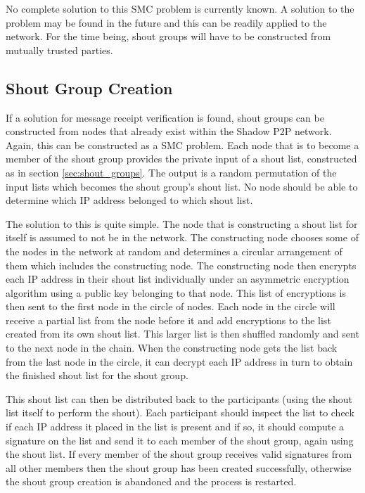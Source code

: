 \documentclass[ %
                    author={Luke Murray},
                supervisor={Dr. Simon Hollis},
                     title={Shadow Peer-to-Peer Networks},
                  subtitle={},
                    degree={MEng},
                      year={2013} ]{thesis}
\begin{document}

No complete solution to this SMC problem is currently known. A solution to the problem may be found in the future and this can be readily applied to the network. For the time being, shout groups will have to be constructed from mutually trusted parties.

\subsection{Shout Group Creation}

If a solution for message receipt verification is found, shout groups can be constructed from nodes that already exist within the Shadow P2P network. Again, this can be constructed as a SMC problem. Each node that is to become a member of the shout group provides the private input of a shout list, constructed as in section \ref{sec:shout_groups}. The output is a random permutation of the input lists which becomes the shout group's shout list. No node should be able to determine which IP address belonged to which shout list.

The solution to this is quite simple. The node that is constructing a shout list for itself is assumed to not be in the network. The constructing node chooses some of the nodes in the network at random and determines a circular arrangement of them which includes the constructing node. The constructing node then encrypts each IP address in their shout list individually under an asymmetric encryption algorithm using a public key belonging to that node. This list of encryptions is then sent to the first node in the circle of nodes. Each node in the circle will receive a partial list from the node before it and add encryptions to the list created from its own shout list. This larger list is then shuffled randomly and sent to the next node in the chain. When the constructing node gets the list back from the last node in the circle, it can decrypt each IP address in turn to obtain the finished shout list for the shout group.

This shout list can then be distributed back to the participants (using the shout list itself to perform the shout). Each participant should inspect the list to check if each IP address it placed in the list is present and if so, it should compute a signature on the list and send it to each member of the shout group, again using the shout list. If every member of the shout group receives valid signatures from all other members then the shout group has been created successfully, otherwise the shout group creation is abandoned and the process is restarted.
\end{document}
